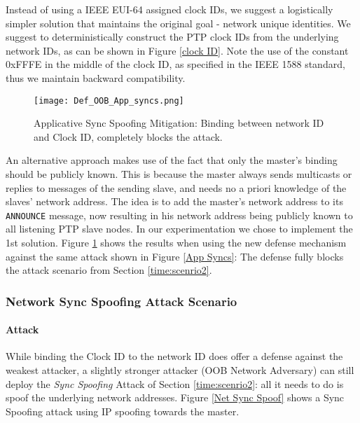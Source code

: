 \documentclass[11pt]{article}
\begin{document}
Instead of using a IEEE EUI-64 assigned clock IDs, we suggest a logistically simpler solution that maintains the original goal - network unique identities. We suggest to deterministically construct the PTP clock IDs from the underlying network IDs, as can be shown in Figure \ref{clock ID}. Note the use of the constant 0xFFFE in the middle of the clock ID, as specified in the IEEE 1588 standard, thus we maintain backward compatibility.



\begin{figure}[t]

\centerline{\texttt{[image: Def\_OOB\_App\_syncs.png]}}

\caption{Applicative Sync Spoofing Mitigation: Binding between network ID and Clock ID, completely blocks the attack.}

\label{2nd Mitigation}

\end{figure}



An alternative approach makes use of the fact that only the master's binding should be publicly known. This is because the master always sends multicasts or replies to messages of the sending slave, and needs no a priori knowledge of the slaves' network address. The idea is to add the master's network address to its \texttt{ANNOUNCE} message, now resulting in his network address being publicly known to all listening PTP slave nodes. In our experimentation we chose to implement the 1st solution. Figure \ref{2nd Mitigation} shows the results when using the new defense mechanism against the same attack shown in Figure \ref{App Syncs}: The defense fully blocks the attack scenario from Section \ref{time:scenrio2}.



\subsubsection{Network Sync Spoofing Attack Scenario}\label{time:scenrio3}

\paragraph{Attack}

While binding the Clock ID to the network ID does offer a defense against the weakest attacker, a slightly stronger attacker (OOB Network Adversary) can still deploy the \emph{Sync Spoofing} Attack of Section \ref{time:scenrio2}: all it needs to do is spoof the underlying network addresses. Figure \ref{Net Sync Spoof} shows a Sync Spoofing attack using IP spoofing towards the master.
\end{document}
